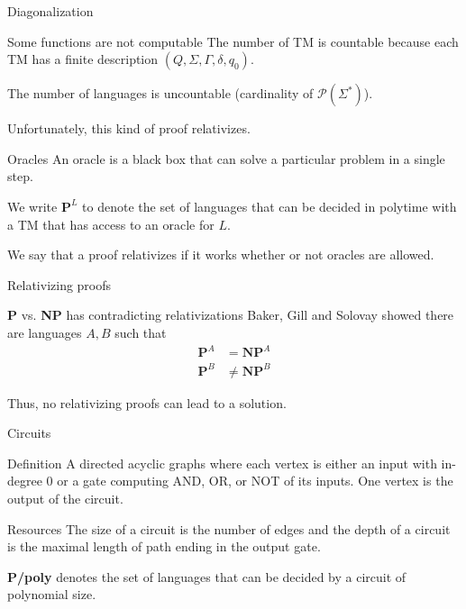 \documentclass{beamer} %
\theoremstyle{definition}
\theoremstyle{remark}
\begin{document}
\begin{frame}{Diagonalization}
	\begin{block}{Some functions are not computable}
		The number of TM is countable because each TM has a finite description $(Q, \Sigma, \Gamma, \delta, q_0)$.
		
		\pause \vspace{10pt}
		The number of languages is uncountable (cardinality of $\mathcal{P}(\Sigma^*)$).
	\end{block}
	\pause
	\vspace{20pt}
	Unfortunately, this kind of proof relativizes.
\end{frame}
\begin{frame}{Oracles}
	An oracle is a black box that can solve a particular problem in a single step.
	
	\pause
	\vspace{10pt}
	We write $\textbf{P}^L$ to denote the set of languages that can be decided in polytime with a TM that has access to an oracle for $L$.
	
	\pause
	\vspace{10pt}
	We say that a proof relativizes if it works whether or not oracles are allowed.
\end{frame}
\begin{frame}{Relativizing proofs}
	\begin{block}{\textbf{P} vs. \textbf{NP} has contradicting relativizations}
		\pause
		Baker, Gill and Solovay showed there are languages $A,B$ such that 
		\begin{align*}
			\textbf{P}^A &= \textbf{NP}^A\\
			\textbf{P}^B &\neq \textbf{NP}^B
		\end{align*}
	\end{block}
	\pause
	Thus, no relativizing proofs can lead to a solution.
\end{frame}
\begin{frame}{Circuits}
	\begin{block}{Definition}
		A directed acyclic graphs where each vertex is either an input with in-degree 0 or a gate computing AND, OR, or NOT of its inputs. One vertex is the output of the circuit. 
	\end{block}
	\pause
	\begin{block}{Resources}
		The size of a circuit is the number of edges and the depth of a circuit is the maximal length of path ending in the output gate.
	\end{block}
	\pause \vspace{10pt}
	\textbf{P/poly} denotes the set of languages that can be decided by a circuit of polynomial size.
\end{frame}
\end{document}
